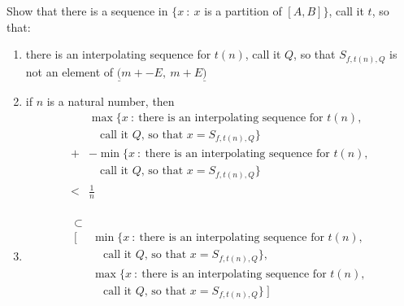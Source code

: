 \documentclass{article}
\begin{document}
\begin{itemize}
\begin{enumerate}[\hspace{1cm}(a.)]
        Show that there is a sequence in $\{ x\ :\ x$ is a partition of $[A,B] \}$, call it $t$, so that:

        \begin{enumerate}[\hspace{1cm}(i.)]

          \item there is an interpolating sequence for $t(n)$, call it $Q$, so that $S_{f, t(n), Q}$ is not an element of $\underline{(} m + -E, \ m + E \underline{)}$

          \item if $n$ is a natural number, then 
            \begin{align*}
                 \ & \max \{ x \ : \ \text{there is an interpolating sequence for $t(n)$, } 
                \\ & \quad \text{call it $Q$, so that $x = S_{f, t(n), Q}$} \}
              \\ + & - \min \{ x \ : \ \text{there is an interpolating sequence for $t(n)$, } 
                \\ & \quad \text{call it $Q$, so that $x = S_{f, t(n), Q}$} \}
              \\ < & \frac{1}{n}
            \end{align*}

          \item 
            \begin{align*}
              [ \ & \min \{ x \ : \ \text{there is an interpolating sequence for $t(n+1)$, } 
               \\ & \quad \text{call it $Q$, so that $x = S_{f, t(n+1), Q}$} \},
               \\ & \max \{ x \ : \ \text{there is an interpolating sequence for $t(n+1)$, } 
               \\ & \quad \text{call it $Q$, so that $x = S_{f, t(n+1), Q}$} \} \ ]
               \\ \subset & \ \\
              [ \ & \min \{ x \ : \ \text{there is an interpolating sequence for $t(n)$, } 
               \\ & \quad \text{call it $Q$, so that $x = S_{f, t(n), Q}$} \},
               \\ & \max \{ x \ : \ \text{there is an interpolating sequence for $t(n)$, } 
               \\ & \quad \text{call it $Q$, so that $x = S_{f, t(n), Q}$} \} \ ]
            \end{align*}
          

\end{enumerate}
\end{enumerate}
\end{itemize}
\end{document}
